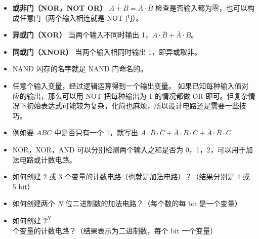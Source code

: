 \begin{itemize}
\item \textbf{或非门（NOR，NOT OR）} $\overline{A+B}=\overline A\cdot\overline B$ 检查是否输入都为零，也可以构成任意门（两个输入相连就是 NOT 门）。
\item \textbf{异或门（XOR）} 当两个输入不同时输出 1，$A\cdot\overline B+\overline A\cdot B$。
\item \textbf{同或门（XNOR）} 当两个输入相同时输出 1，即异或取非。
\item NAND 闪存的名字就是 NAND 门命名的。
\item 任意个输入变量，经过逻辑运算得到一个输出变量。 如果已知每种输入值对应的输出，那么可以用 NOT 把每种输出为 1 的情况都做 OR 即可。但复杂情况下初始表达式可能较为复杂，化简也麻烦，所以设计电路还是需要一些技巧。
\item 例如要 $ABC$ 中是否只有一个 1，就写出 $A\cdot\overline B\cdot\overline C + \overline A\cdot B\cdot\overline C + \overline A\cdot\overline B\cdot C$
\item NOR，XOR，AND 可以分别检测两个输入之和是否为 0，1，2，可以用于加法电路或计数电路。
\item 如何创建 2 或 3 个变量的计数电路（也就是加法电路）？（结果分别是 4 或 5 bit）
\item 如何创建两个 $N$ 位二进制数的加法电路？（每个数的每 bit 是一个变量）
\item 如何创建 $2^N$ 个变量的计数电路？（结果表示为二进制数，每个 bit 一个变量）
\end{itemize}

